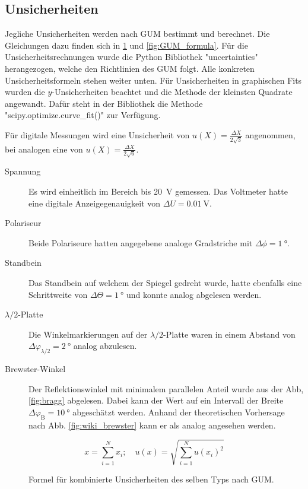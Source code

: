 \subsection{Unsicherheiten}\label{VGuD}

Jegliche Unsicherheiten werden nach GUM bestimmt und berechnet.
Die Gleichungen dazu finden sich in \ref{fig:GUM_combine} und \ref{fig:GUM_formula}.
Für die Unsicherheitsrechnungen wurde die Python Bibliothek "uncertainties" herangezogen, welche den Richtlinien des GUM folgt.
Alle konkreten Unsicherheitsformeln stehen weiter unten.
Für Unsicherheiten in graphischen Fits wurden die $y$-Unsicherheiten beachtet und die Methode der kleinsten Quadrate angewandt.
Dafür steht in der Bibliothek die Methode "scipy.optimize.curve\_fit()" zur Verfügung.

Für digitale Messungen wird eine Unsicherheit von $u(X) = \frac{\Delta X}{2\sqrt{3}}$ angenommen, bei analogen eine von $u(X) = \frac{\Delta X}{2\sqrt{6}}$.

\begin{description}
	\item[Spannung]	Es wird einheitlich im Bereich bis \SI{20}{\volt} gemessen.
	Das Voltmeter hatte eine digitale Anzeigegenauigkeit von $\Delta U = \SI{0.01}{\volt}$.
	
	\item[Polariseur] Beide Polariseure hatten angegebene analoge Gradstriche mit $\Delta \phi = \SI{1}{\degree}$.
	
	\item[Standbein] Das Standbein auf welchem der Spiegel gedreht wurde, hatte ebenfalls eine Schrittweite von $\Delta \Theta = \SI{1}{\degree}$ und konnte analog abgelesen werden.
	
	\item[$\lambda/2$-Platte] Die Winkelmarkierungen auf der $\lambda/2$-Platte waren in einem Abstand von $\Delta \varphi_{\lambda/2} = \SI{2}{\degree}$ analog abzulesen.
	
	\item[Brewster-Winkel] Der Reflektionswinkel mit minimalem parallelen Anteil wurde aus der Abb, \ref{fig:bragg} abgelesen.
	Dabei kann der Wert auf ein Intervall der Breite $\Delta \varphi_\text{B} = \SI{10}{\degree}$ abgeschätzt werden.
	Anhand der theoretischen Vorhersage nach Abb. \ref{fig:wiki_brewster} kann er als analog angesehen werden.
	
\end{description}

\begin{figure}[ht]
	\begin{equation*}
		x = \sum_{i=1}^{N} x_i
		;\quad
		u(x) = \sqrt{\sum_{i = 1}^{N} u(x_i)^2}
	\end{equation*}
	\caption{Formel für kombinierte Unsicherheiten des selben Typs nach GUM.}
	\label{fig:GUM_combine}
\end{figure}

